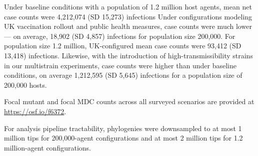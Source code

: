 Under baseline conditions with a population of 1.2 million host agents, mean net case counts were 4,212,074 (SD 15,273) infections
Under configurations modeling UK vaccination rollout and public health measures, case counts were much lower --- on average, 18,902 (SD 4,857) infections for population size 200,000.
For population size 1.2 million, UK-configured mean case counts were 93,412 (SD 13,418) infections.
Likewise, with the introduction of high-transmissibility strains in our multistrain experiments, case counts were higher than under baseline conditions, on average 1,212,595 (SD 5,645) infections for a population size of 200,000 hosts.

Focal mutant and focal MDC counts across all surveyed scenarios are provided at \url{https://osf.io/f6372}.

For analysis pipeline tractability, phylogenies were downsampled to at most 1 million tips for 200,000-agent configurations and at most 2 million tips for 1.2 million-agent configurations.
